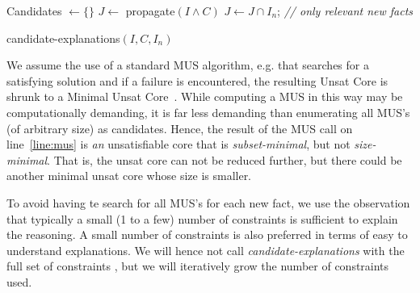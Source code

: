 \begin{algorithm}
% 

% 

  Candidates $\gets \{\}$\;
  $J \gets$ propagate$(I \wedge C)$\;
  $J \gets J \cap I_n$; \textit{\small // only relevant new facts}\\
\caption{candidate-explanations$(I,C,I_n)$}

\label{alg:cand}
\end{algorithm}


We assume the use of a standard MUS algorithm, e.g. that searches for a satisfying solution and if a failure is encountered, the resulting Unsat Core is shrunk to a Minimal Unsat Core~\cite{}. While computing a MUS in this way may be computationally demanding, it is far less demanding than enumerating all MUS's (of arbitrary size) as candidates. 
Hence, the result of the MUS call on line~\ref{line:mus} is \textit{an} unsatisfiable core that is \textit{subset-minimal}, but not \textit{size-minimal}. That is, the unsat core can not be reduced further, but there could be another minimal unsat core whose size is smaller.


To avoid having te search for all MUS's for each new fact, we use the observation that typically a small (1 to a few) number of constraints is sufficient to explain the reasoning. A small number of constraints is also preferred in terms of easy to understand explanations. We will hence not call \textit{candidate-explanations} with the full set of constraints \allconstraints, but we will iteratively grow the number of constraints used. 

